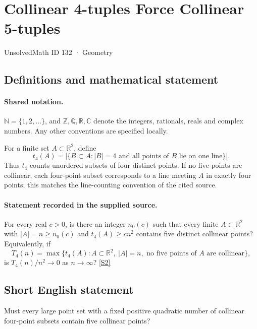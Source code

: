 \documentclass[11pt]{article}
\newcommand{\sref}[2]{\hyperlink{source:#1:#2}{[S#2]}}
\begin{document}
\setcounter{section}{131}
\section{Collinear 4-tuples Force Collinear 5-tuples}\label{132}
{\small\sffamily UnsolvedMath ID 132 · Geometry}
\subsection{Definitions and mathematical statement}

\paragraph{Shared notation.}$\mathbb N=\{1,2,\ldots\}$, and $\mathbb Z,\mathbb Q,\mathbb R,\mathbb C$ denote the integers, rationals, reals and complex numbers. Any other conventions are specified locally.


For a finite set $A\subset\mathbb R^2$, define
\[
 t_4(A)=\bigl|\{B\subset A:|B|=4\text{ and all points of }B\text{ lie on one line}\}\bigr|.
\]
Thus $t_4$ counts unordered subsets of four distinct points. If no five points are collinear, each four-point subset corresponds to a line meeting $A$ in exactly four points; this matches the line-counting convention of the cited source.
\paragraph{Statement recorded in the supplied source.}
For every real $c>0$, is there an integer $n_0(c)$ such that every finite $A\subset\mathbb R^2$ with $|A|=n\geq n_0(c)$ and $t_4(A)\geq c n^2$ contains five distinct collinear points? Equivalently, if
\[
 T_4(n)=\max\{t_4(A):A\subset\mathbb R^2,\ |A|=n,\text{ no five points of }A\text{ are collinear}\},
\]
is $T_4(n)/n^2\longrightarrow0$ as $n\to\infty$? \sref{132}{2}
\subsection{Short English statement}
Must every large point set with a fixed positive quadratic number of collinear four-point subsets contain five collinear points?
\end{document}
